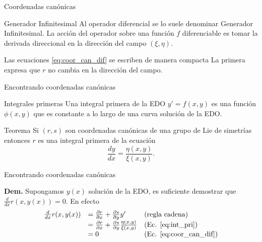 \documentclass[handout,hyperref={colorlinks=true}]{beamer}
\renewcommand{\emph}[1]{\textcolor[rgb]{1,0,0}{#1}}
\newcommand{\nl}{\onslide<+-> }
\begin{document}
\begin{frame}{Coordenadas canónicas}
 \begin{block}{Generador Infinitesimal}
Al operador diferencial
se lo suele denominar \emph{Generador Infinitesimal}. La acción del operador sobre una función $f$ diferenciable es tomar la derivada direccional en la dirección del campo $(\xi,\eta)$. 
\end{block}

Las ecuaciones \eqref{eq:coor_can_dif} se escriben de manera compacta
La primera expresa que $r$ no cambia en la dirección del campo.

\end{frame}






\begin{frame}{Encontrando coordenadas canónicas}

\nl \begin{block}{Integrales primeras}
Una integral primera de la EDO $y'=f(x,y)$ es una función $\phi(x,y)$ que es constante a lo largo de una curva solución de la EDO. 
\end{block}

\nl \begin{block}{Teorema} Si $(r,s)$ son coordenadas canónicas de una grupo de Lie de simetrías entonces $r$ es una integral primera de la ecuación
\begin{equation}\label{eq:int_pri} \frac{dy}{dx}=\frac{\eta(x,y)}{\xi(x,y)}.
\end{equation}
\end{block}


\end{frame}


\begin{frame}{Encontrando coordenadas canónicas}

\textbf{Dem.} Supongamos $y(x)$ solución de la EDO, es suficiente demostrar que $\frac{d}{dx}r(x,y(x))=0$. En efecto
\[
\begin{array}{lll}
 \frac{d}{dx}r(x,y(x)) &=\frac{\partial r}{\partial x}+\frac{\partial s}{\partial y}y' &\text{(regla cadena)}\\
&=\frac{\partial r}{\partial x}+\frac{\partial s}{\partial y}\frac{\eta(x,y)}{\xi(x,y)}& \text{(Ec. \eqref{eq:int_pri})}\\
&=0 & \text{(Ec. \eqref{eq:coor_can_dif})}\\
\end{array}
\]
\end{frame}
\end{document}
